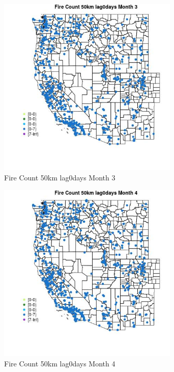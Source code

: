 \begin{figure} 
\centering  
\includegraphics[width=0.77\textwidth]{Code_Outputs/Report_ML_input_PM25_Step4_part_e_de_duplicated_aves_compiled_2019-05-21wNAs_MapObsMo3Fire_Count_50km_lag0days.jpg} 
\caption{\label{fig:Report_ML_input_PM25_Step4_part_e_de_duplicated_aves_compiled_2019-05-21wNAsMapObsMo3Fire_Count_50km_lag0days}Fire Count 50km lag0days Month 3} 
\end{figure} 
 

\begin{figure} 
\centering  
\includegraphics[width=0.77\textwidth]{Code_Outputs/Report_ML_input_PM25_Step4_part_e_de_duplicated_aves_compiled_2019-05-21wNAs_MapObsMo4Fire_Count_50km_lag0days.jpg} 
\caption{\label{fig:Report_ML_input_PM25_Step4_part_e_de_duplicated_aves_compiled_2019-05-21wNAsMapObsMo4Fire_Count_50km_lag0days}Fire Count 50km lag0days Month 4} 
\end{figure} 
 

